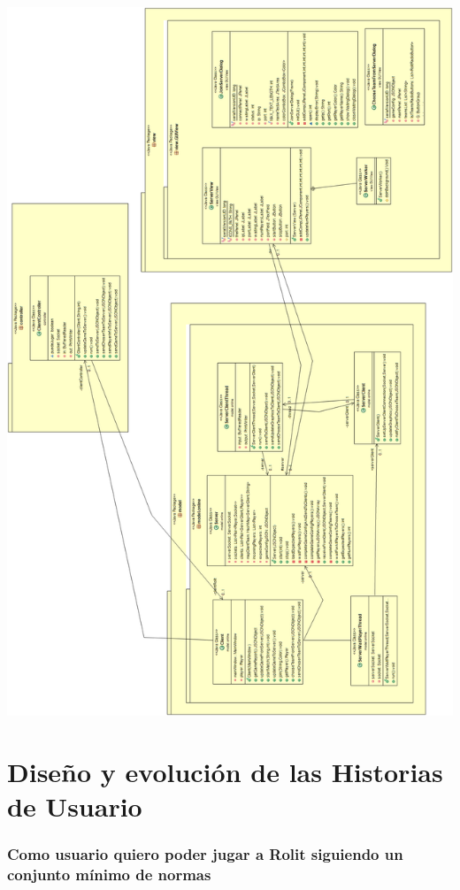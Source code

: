 \documentclass[../DocumentoOficial.tex]{subfiles}
\begin{document}
\begin{center}
\includegraphics[scale=0.4]{mvconlineuml.png} 
\end{center}


\chapter{Diseño y evolución de las Historias de Usuario}

\subsection{Como usuario quiero poder jugar a Rolit siguiendo un conjunto mínimo de normas}
\end{document}
